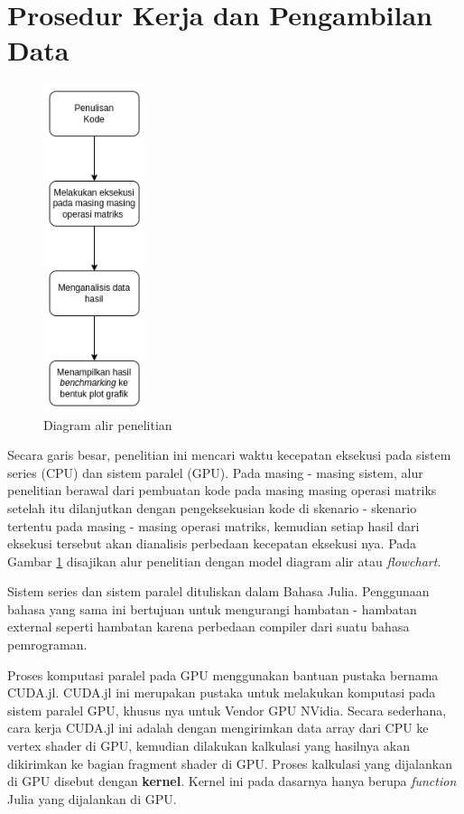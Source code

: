 \section{Prosedur Kerja dan Pengambilan Data}

\begin{figure}[h]
  \centering
  \includegraphics[width=3cm, scale=1]{schema/metode.drawio.png}
  \caption{Diagram alir penelitian}
  \label{img:methods}
\end{figure}

Secara garis besar, penelitian ini mencari waktu kecepatan eksekusi pada sistem
series (CPU) dan sistem paralel (GPU). Pada masing - masing sistem, alur
penelitian berawal dari pembuatan kode pada masing masing operasi matriks
setelah itu dilanjutkan dengan pengeksekusian kode di skenario - skenario
tertentu pada masing - masing operasi matriks, kemudian setiap hasil dari
eksekusi tersebut akan dianalisis perbedaan kecepatan eksekusi nya. Pada Gambar
\ref{img:methods} disajikan alur penelitian dengan model diagram alir atau
\emph{flowchart}.

Sistem series dan sistem paralel dituliskan dalam Bahasa Julia. Penggunaan
bahasa yang sama ini bertujuan untuk mengurangi hambatan - hambatan external
seperti hambatan karena perbedaan compiler dari suatu bahasa pemrograman.

Proses komputasi paralel pada GPU menggunakan bantuan pustaka bernama
CUDA.jl. CUDA.jl ini merupakan pustaka untuk melakukan komputasi pada
sistem paralel GPU, khusus nya untuk Vendor GPU NVidia. Secara sederhana, cara
kerja CUDA.jl ini adalah dengan mengirimkan data array dari CPU ke vertex
shader di GPU, kemudian dilakukan kalkulasi yang hasilnya akan dikirimkan ke
bagian fragment shader di GPU. Proses kalkulasi yang dijalankan di GPU disebut
dengan \textbf{kernel}. Kernel ini pada dasarnya hanya berupa \emph{function}
Julia yang dijalankan di GPU.

